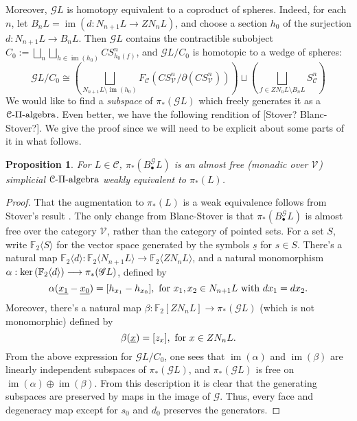 \documentclass[11pt]{amsart}
\theoremstyle{plain}
\newtheorem{prop}[thm]{Proposition}
\theoremstyle{definition}
\renewcommand{\ker}{\textup{ker}\,}
\DeclareMathOperator{\im}{im}
\renewcommand{\to}{\longrightarrow}
\newcommand{\scrQ}{\mathscr{Q}}
\newcommand{\scrR}{\mathscr{R}}
\newcommand{\scrT}{\mathscr{T}}
\newcommand{\scrY}{\mathscr{Y}}
\newcommand{\scrI}{\mathscr{I}}
\newcommand{\scrO}{\mathscr{O}}
\newcommand{\scrP}{\mathscr{P}}
\newcommand{\scrS}{\mathscr{S}}
\newcommand{\scrG}{\mathscr{G}}
\newcommand{\scrH}{\mathscr{H}}
\newcommand{\scrJ}{\mathscr{J}}
\newcommand{\scrK}{\mathscr{K}}
\newcommand{\scrL}{\mathscr{L}}
\newcommand{\scrZ}{\mathscr{Z}}
\newcommand{\scrN}{\mathscr{N}}
\newcommand{\scrM}{\mathscr{M}}
\newcommand{\calC}{\mathcal{C}}
\newcommand{\calV}{\mathcal{V}}
\theoremstyle{plain}
\newcommand{\vect}[2]{\calV^{#1}_{#2}}
\newcommand{\BSW}{{\scrG}}%
\newcommand{\F}{\mathbb{F}}
\begin{document}
\begin{Composite functor spectral sequences}
Moreover, $\BSW L$ is homotopy equivalent to a coproduct of spheres. Indeed, for each $n$, let $B_nL=\im (d:N_{n+1}L\to ZN_nL)$, and choose a section $h_0$ of the surjection $d:N_{n+1}L\to B_nL$. Then $\BSW L$ contains the contractible subobject $C_0:=\bigsqcup_n\bigsqcup_{h\in \im (h_0)} CS^n_{h_0(f)}$, and $\BSW L/C_0$ is homotopic to a wedge of spheres:
\[\BSW L/C_0\cong \left(\bigsqcup_{N_{n+1}L\setminus\im (h_0)}F_\calC (CS^n_{\vect{}{}}/\partial(CS^n_{\vect{}{}}))\right) \sqcup\left(\bigsqcup_{f\in ZN_nL\setminus B_nL}S^n_\calC\right)\]
We would like to find a \emph{subspace} of $\pi_*(\BSW L)$ which freely generates it as a $\calC\textup{-$\Pi$-algebra}$. Even better, we have the following rendition of [Stover? Blanc-Stover?]. We give the proof since we will need to be explicit about some parts of it in what follows.
\begin{prop}
For $L\in\calC$, $\pi_*(B_\bullet^{\BSW}L)$ is an almost free (monadic over $\vect{}{}$) simplicial $\calC\textup{-$\Pi$-algebra}$ weakly equivalent to $\pi_*(L)$.
\end{prop}
\begin{proof}
That the augmentation to $\pi_*(L)$ is a weak equivalence follows from Stover's result \cite[2.7]{StoverVanKampen.pdf}. The only change from Blanc-Stover is that $\pi_*(B_\bullet^{\BSW}L)$ is almost free over the category $\vect{}{}$, rather than the category of pointed sets.
For a set $S$, write $\F_2\langle S\rangle$ for the vector space generated by the symbols $\underline{s}$ for $s\in S$. There's a natural map $\F_2\langle d\rangle :\F_2\langle N_{n+1}L\rangle \to \F_2\langle ZN_nL\rangle $, and a natural monomorphism $\alpha:\ker(\F_2\langle d\rangle)\to \pi_*(\BSW L)$, defined by
\[\alpha(\underline{x_1}-\underline{x_0})=[h_{x_1}-h_{x_0}],\textup{ for $x_1,x_2\in N_{n+1}L$ with $dx_1=dx_2$}.\]
Moreover, there's a natural map $\beta:\F_2[ZN_nL]\to\pi_*(\BSW L)$ (which is not monomorphic) defined by
\[\beta(\underline{x})=[z_{x}],\textup{ for $x\in ZN_{n}L$}.\]
From the above expression for $\BSW L/C_0$, one sees that $\im (\alpha)$ and $\im (\beta)$ are linearly independent subspaces of $\pi_*(\BSW L)$, and $\pi_*(\BSW L)$ is free on $\im (\alpha)\oplus\im (\beta)$. From this description it is clear that the generating subspaces are preserved by maps in the image of $\BSW $. Thus, every face and degeneracy map except for $s_0$ and $d_0$ preserves the generators.


\end{proof}
\end{Composite functor spectral sequences}
\end{document}
